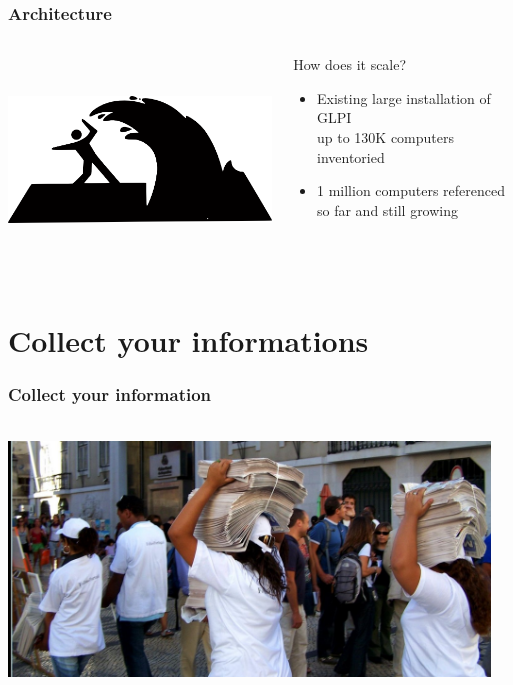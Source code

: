 \documentclass{beamer}
\begin{document}
\begin{frame}
    \frametitle{Architecture}

 \begin{columns}
 \begin{column}{0.34\textwidth}
    \includegraphics[height=5.5cm]{pics/scale.png}
 \end{column}
 \begin{column}{0.90\textwidth}
    \begin{block}{How does it scale?}
        \begin{itemize}
            \item Existing large installation of GLPI \\
            {\small up to 130K computers inventoried}
            \item 1 million computers referenced so far and still growing
        \end{itemize}
    \end{block}
 \end{column}
\end{columns}
\end{frame}


\section{Collect your informations}

\begin{frame}

    \frametitle{Collect your information}

 \begin{columns}
 \begin{column}{0.34\textwidth}
    \includegraphics[height=6.5cm]{pics/information.jpg}
 \end{column}
 \begin{column}{0.90\textwidth}
 \end{column}
\end{columns}


\end{frame}
\end{document}
